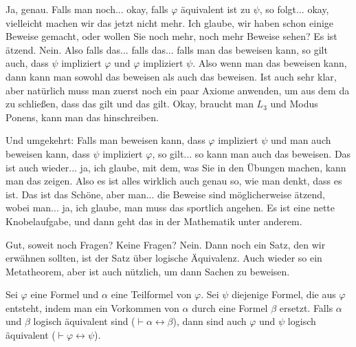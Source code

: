 \begin{spoken-clean}[01:09:46 - 01:11:17]
Ja, genau. Falls man noch... okay, falls $\varphi$ äquivalent ist zu $\psi$, so folgt... okay, vielleicht machen wir das jetzt nicht mehr. Ich glaube, wir haben schon einige Beweise gemacht, oder wollen Sie noch mehr, noch mehr Beweise sehen? Es ist ätzend. Nein. Also falls das... falls das... falls man das beweisen kann, so gilt auch, dass $\psi$ impliziert $\varphi$ und $\varphi$ impliziert $\psi$. Also wenn man das beweisen kann, dann kann man sowohl das beweisen als auch das beweisen. Ist auch sehr klar, aber natürlich muss man zuerst noch ein paar Axiome anwenden, um aus dem da zu schließen, dass das gilt und das gilt. Okay, braucht man $L_3$ und Modus Ponens, kann man das hinschreiben.

Und umgekehrt: Falls man beweisen kann, dass $\varphi$ impliziert $\psi$ und man auch beweisen kann, dass $\psi$ impliziert $\varphi$, so gilt... so kann man auch das beweisen. Das ist auch wieder... ja, ich glaube, mit dem, was Sie in den Übungen machen, kann man das zeigen. Also es ist alles wirklich auch genau so, wie man denkt, dass es ist. Das ist das Schöne, aber man... die Beweise sind möglicherweise ätzend, wobei man... ja, ich glaube, man muss das sportlich angehen. Es ist eine nette Knobelaufgabe, und dann geht das in der Mathematik unter anderem.
\end{spoken-clean}

\begin{spoken-clean}[01:12:34 - 01:13:08]
Gut, soweit noch Fragen? Keine Fragen? Nein. Dann noch ein Satz, den wir erwähnen sollten, ist der Satz über logische Äquivalenz. Auch wieder so ein Metatheorem, aber ist auch nützlich, um dann Sachen zu beweisen.
\end{spoken-clean}

\begin{math-stroke}
Sei $\varphi$ eine Formel und $\alpha$ eine Teilformel von $\varphi$. Sei $\psi$ diejenige Formel, die aus $\varphi$ entsteht, indem man ein Vorkommen von $\alpha$ durch eine Formel $\beta$ ersetzt. Falls $\alpha$ und $\beta$ logisch äquivalent sind ($\vdash \alpha \leftrightarrow \beta$), dann sind auch $\varphi$ und $\psi$ logisch äquivalent ($\vdash \varphi \leftrightarrow \psi$).
\end{math-stroke}

